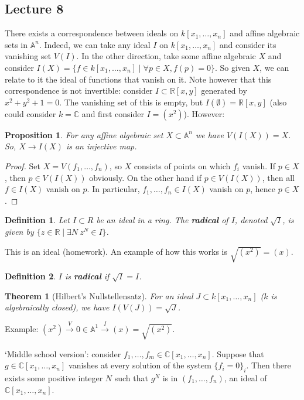\documentclass[12pt]{article}
\newcommand{\C}{\mathbb{C}}
\newcommand{\R}{\mathbb{R}}
\newcommand{\A}{\mathbb{A}}
\newtheorem{definition}{Definition}[section]
\newtheorem{theorem}{Theorem}[section]
\newtheorem{proposition}{Proposition}[section]
\begin{document}
    \subsection{Lecture 8}
    There exists a correspondence between ideals on $k[x_1, \dots, x_n]$ and affine algebraic sets in $\A^n$. Indeed, we can take any ideal $I$ on $k[x_1, \dots, x_n]$ and consider its vanishing set $V(I)$.
    In the other direction, take some affine algebraic $X$ and consider $I(X) = \{f \in k[x_1, \dots, x_n] \mid \forall p \in X, f(p) = 0\}$.
    So given $X$, we can relate to it the ideal of functions that vanish on it. Note however that this correspondence is not invertible: consider $I \subset \R[x, y]$ generated by $x^2 + y^2 + 1 = 0$. The vanishing set of this is empty, but $I(\emptyset) = \R[x, y]$ (also could consider $k = \C$ and first consider $I = (x^2)$). However:
    \begin{proposition}
        For any affine algebraic set $X \subset \A^n$ we have $V(I(X)) = X$. So, $X \to I(X)$ is an injective map.
    \end{proposition}
    \begin{proof}
        Set $X = V(f_1, \dots, f_n)$, so $X$ consists of points on which $f_i$ vanish. If $p \in X$, then $p \in V(I(X))$ obviously. On the other hand if $p \in V(I(X))$, then all $f \in I(X)$ vanish on $p$. In particular, $f_1, \dots, f_n \in I(X)$ vanish on $p$, hence $p \in X$.
    \end{proof}
    \begin{definition}
        Let $I \subset R$ be an ideal in a ring. The \textbf{radical} of $I$, denoted $\sqrt{I}$, is given by $\{z \in \R \mid \exists N\: z^N \in I\}$.
    \end{definition}
    This is an ideal (homework). An example of how this works is $\sqrt{(x^2)} = (x)$.
    \begin{definition}
        $I$ is \textbf{radical} if $\sqrt{I} = I$.
    \end{definition}
    \begin{theorem}
        [Hilbert's Nullstellensatz] For an ideal $J \subset k[x_1, \dots, x_n]$ ($k$ is algebraically closed), we have $I(V(J)) = \sqrt{J}$.
    \end{theorem}
    Example: $(x^2) \xrightarrow{V} 0 \in \A^1 \xrightarrow{I} (x) = \sqrt{(x^2)}$. \par
    `Middle school version': consider $f_1, \dots, f_m \in \C[x_1, \dots, x_n]$. Suppose that $g \in \C[x_1, \dots, x_n]$ vanishes at every solution of the system $\{f_i = 0\}_i$. Then there exists some positive integer $N$ such that $g^N$ is in $(f_1, \dots, f_n)$, an ideal of $\C[x_1, \dots, x_n]$. \par
\end{document}
